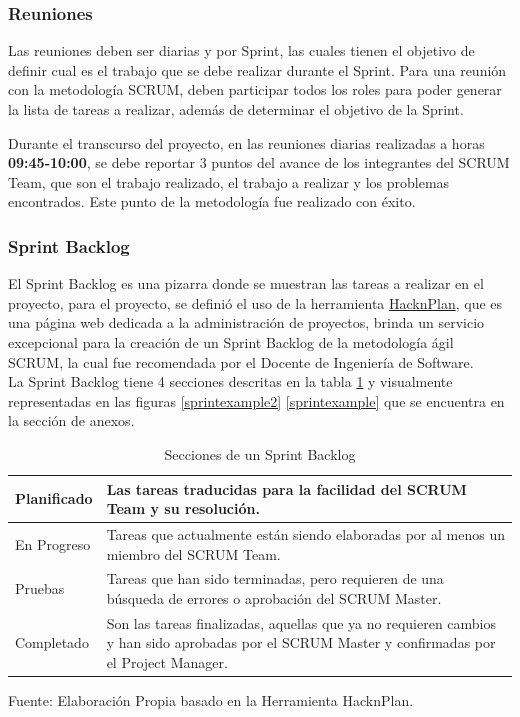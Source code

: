 \subsubsection{Reuniones}

Las reuniones deben ser diarias y por Sprint, las cuales tienen el objetivo de definir cual es el trabajo que se debe realizar durante el Sprint. Para una reunión con la metodología SCRUM, deben participar todos los roles para poder generar la lista de tareas a realizar, además de determinar el objetivo de la Sprint.

Durante el transcurso del proyecto, en las reuniones diarias realizadas a horas \textbf{09:45-10:00}, se debe reportar 3 puntos del avance de los integrantes del SCRUM Team, que son el trabajo realizado, el trabajo a realizar y los problemas encontrados. Este punto de la metodología fue realizado con éxito.

\subsubsection{Sprint Backlog}

El Sprint Backlog es una pizarra donde se muestran las tareas a realizar en el proyecto, para el proyecto, se definió el uso de la herramienta \href{https://hacknplan.com/}{HacknPlan}, que es una página web dedicada a la administración de proyectos, brinda un servicio excepcional para la creación de un Sprint Backlog de la metodología ágil SCRUM, la cual fue recomendada por el Docente de Ingeniería de Software.
\\
La Sprint Backlog tiene 4 secciones descritas en la tabla \ref{sprintbacklog} y visualmente representadas en las figuras \ref{sprintexample2} \ref{sprintexample} que se encuentra en la sección de anexos.


\begin{table}[t]
	\begin{center}
		\begin{tabular}{| m{3cm} | m{11cm} |  }
			\hline Planificado & Las tareas traducidas para la facilidad del SCRUM Team y su resolución. \\ \hline
			En Progreso & Tareas que actualmente están siendo elaboradas por al menos un miembro del SCRUM Team. \\ \hline
			Pruebas & Tareas que han sido terminadas, pero requieren de una búsqueda de errores o aprobación del SCRUM Master. \\ \hline
			Completado & Son las tareas finalizadas, aquellas que ya no requieren cambios y han sido aprobadas por el SCRUM Master y confirmadas por el Project Manager.  \\ \hline
		\end{tabular}
		\caption{Secciones de un Sprint Backlog}
		\label{sprintbacklog}
		\footnotesize Fuente: Elaboración Propia basado en la Herramienta HacknPlan.
	\end{center}
\end{table}

